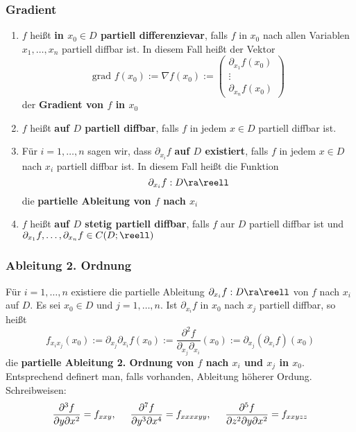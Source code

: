 \documentclass{kit}
\begin{document}
    \subsubsection{Gradient}
      \begin{enumerate}
        \item $f$ heißt \textbf{in $x_0\in D$ partiell differenzievar}, falls $f$ in $x_0$ nach allen Variablen 
          $x_1,\dots,x_n$ partiell diffbar ist. In diesem Fall heißt der Vektor
          $$\text{grad }f(x_0):=\nabla f(x_0):=\begin{pmatrix}
            \partial_{x_1}f(x_0)\\
            \vdots\\
            \partial_{x_n}f(x_0)
          \end{pmatrix}$$
          der \textbf{Gradient von $f$ in $x_0$}
        \item $f$ heißt \textbf{auf $D$ partiell diffbar}, falls $f$ in jedem $x\in D$ partiell diffbar ist.
        \item Für $i=1,\dots,n$ sagen wir, dass $\partial_{x_i}f$ \textbf{auf $D$ existiert}, falls $f$ in jedem $x\in D$ 
          nach $x_i$ partiell diffbar ist. In diesem Fall heißt die Funktion
          $$\partial_{x_i}f:D\ra\reell$$
          die \textbf{partielle Ableitung von $f$ nach $x_i$}
        \item $f$ heißt \textbf{auf $D$ stetig partiell diffbar}, falls $f$ aur $D$ partiell diffbar ist und 
          $\partial_{x_1}f,\dots,\partial_{x_n}f\in C(D;\reell)$
      \end{enumerate}
    \subsubsection{Ableitung 2. Ordnung}
      Für $i=1,\dots,n$ existiere die partielle Ableitung $\partial_{x_i}f:D\ra\reell$ von $f$ nach $x_i$ auf $D$. Es sei 
      $x_0\in D$ und $j=1,\dots,n$. Ist $\partial_{x_i}f$ in $x_0$ nach $x_j$ partiell diffbar, so heißt
      $$f_{x_ix_j}(x_0):=\partial_{x_j}\partial_{x_i}f(x_0):=\frac{\partial^2f}{\partial_{x_j}\partial_{x_i}}(x_0):=
      \partial_{x_j}(\partial_{x_i}f)(x_0)$$
      die \textbf{partielle Ableitung 2. Ordnung von $f$ nach $x_i$ und $x_j$ in $x_0$}. Entsprechend definert man, falls 
      vorhanden, Ableitung höherer Ordung. Schreibweisen:
      $$\frac{\partial^3f}{\partial y\partial x^2}=f_{xxy},\hspace{0.5cm}\frac{\partial^7f}{\partial y^3\partial x^4}=
      f_{xxxxyy},\hspace{0.5cm}\frac{\partial^5f}{\partial z^2\partial y\partial x^2}=f_{xxyzz}$$
\end{document}

